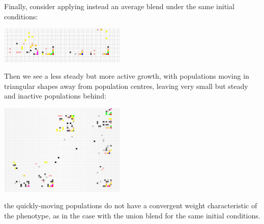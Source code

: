 \documentclass{AISB2008}
\begin{document}
Finally, consider applying instead an average blend under the same
initial conditions:
 \begin{center}
 \includegraphics[width=0.45\textwidth]{init2_average.jpg}
 \end{center}
Then we see a less steady but more active growth, with populations moving in triangular shapes away from population centres, leaving very small but steady and inactive populations behind:
 \begin{center}
 \includegraphics[width=0.45\textwidth]{init2daverage++.jpg}
 \end{center}
\noindent the quickly-moving populations do not have a convergent weight characteristic of the phenotype, as in the case with the union blend for the same initial conditions. 




\FloatBarrier
\end{document}
